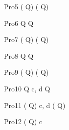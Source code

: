 \begin{circus}
    \circprocess Pro5 \circdef (  \rcirctime \circstartby Q) \extchoice (  \rcirctime \circstartby Q) \\
\end{circus}


\begin{circus}
    \circprocess Pro6 \circdef  {} \rcirctime \circstartby Q \intchoice {} \rcirctime \circstartby Q  \\
\end{circus}
    
\begin{circus}
    \circprocess Pro7 \circdef (  \rcirctime \circstartby Q) \intchoice (  \rcirctime \circstartby Q) \\
\end{circus}
    
\begin{circus}
    \circprocess Pro8 \circdef  {} \rcirctime \circstartby Q \interleave {} \rcirctime \circstartby Q \\
\end{circus}

\begin{circus}
    \circprocess Pro9 \circdef (  \rcirctime \circstartby Q) \interleave (  \rcirctime \circstartby Q) \\
\end{circus}



\begin{circus}
    \circprocess Pro10 \circdef  {} \rcirctime \circstartby Q \lpar  \lchanset c, d \rchanset  \rpar   {} \rcirctime \circstartby Q \\
\end{circus}

\begin{circus}
    \circprocess Pro11 \circdef (  \rcirctime \circstartby Q) \lpar  \lchanset c, d \rchanset  \rpar (  \rcirctime \circstartby Q) \\
\end{circus}


\begin{circus}
    \circprocess Pro12 \circdef (  \rcirctime \circstartby Q) \circhide c \\
\end{circus} 



